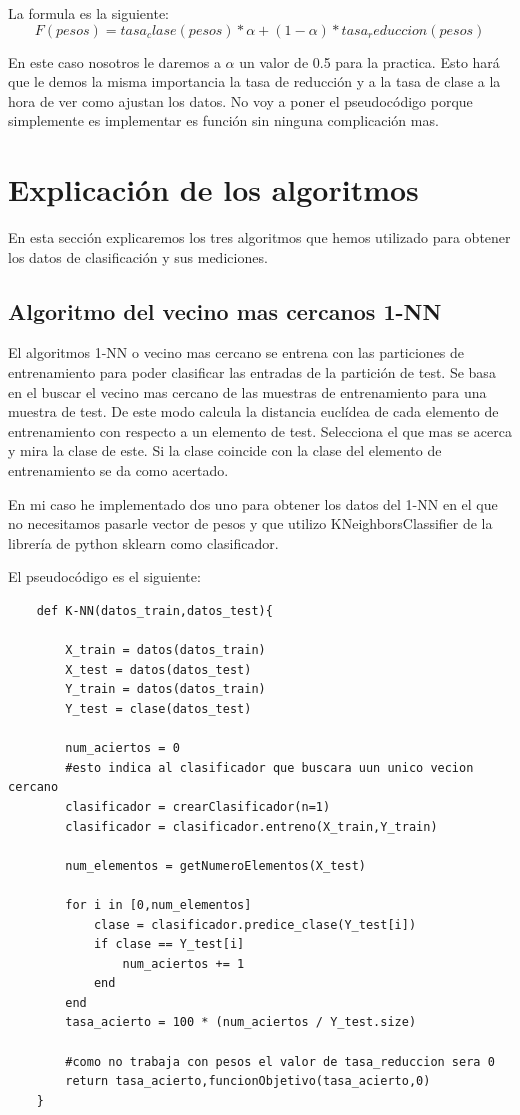 \documentclass[titlepage]{article}
\begin{document}
	La formula es la siguiente:
	$$
	F(pesos) = tasa_clase(pesos) * \alpha + (1 - \alpha) * tasa_reduccion(pesos)
	$$ 
	
	En este caso nosotros le daremos a $\alpha$ un valor de 0.5 para la practica. Esto hará que le demos la misma importancia la tasa de reducción y a la tasa de clase a la hora de ver como ajustan los datos. No voy a poner el pseudocódigo porque simplemente es implementar es función sin ninguna complicación mas.
	
	\section{Explicación de los algoritmos}
	En esta sección explicaremos los tres algoritmos que hemos utilizado para obtener los datos de clasificación y sus mediciones.
	
	\subsection{Algoritmo del vecino mas cercanos 1-NN}
	El algoritmos 1-NN o vecino mas cercano se entrena con las particiones de entrenamiento para poder clasificar las entradas de la partición de test. Se basa en el buscar el vecino mas cercano de las muestras de entrenamiento para una muestra de test. De este modo calcula la distancia euclídea de cada elemento de entrenamiento con respecto a un elemento de test. Selecciona el que mas se acerca y mira la clase de este. Si la clase coincide con la clase del elemento de entrenamiento se da como acertado.
	
	En mi caso he implementado dos uno para obtener los datos del 1-NN en el que no necesitamos pasarle vector de pesos y que utilizo KNeighborsClassifier de la librería de python sklearn como clasificador.
	
	El pseudocódigo es el siguiente:
	\begin{lstlisting}
	def K-NN(datos_train,datos_test){
	
		X_train = datos(datos_train)
		X_test = datos(datos_test)
		Y_train = datos(datos_train)
		Y_test = clase(datos_test)
		
		num_aciertos = 0
		#esto indica al clasificador que buscara uun unico vecion cercano
		clasificador = crearClasificador(n=1)
		clasificador = clasificador.entreno(X_train,Y_train)
		
		num_elementos = getNumeroElementos(X_test)
		
		for i in [0,num_elementos]
			clase = clasificador.predice_clase(Y_test[i])
			if clase == Y_test[i]
				num_aciertos += 1
			end
		end
		tasa_acierto = 100 * (num_aciertos / Y_test.size)
		
		#como no trabaja con pesos el valor de tasa_reduccion sera 0
		return tasa_acierto,funcionObjetivo(tasa_acierto,0)
	}
	\end{lstlisting}
	
\end{document}
